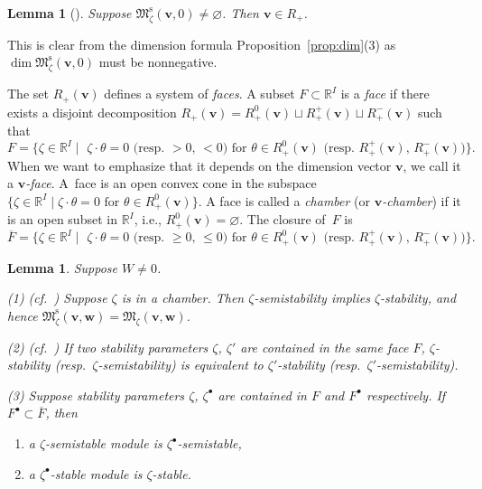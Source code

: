 \documentclass[11pt]{article}
\newenvironment{aenume}{%
  \begin{enumerate}%
  \renewcommand{\theenumi}{\alph{enumi}}%
  \renewcommand{\labelenumi}{\textup{(\theenumi)}}%
  }{\end{enumerate}}
\newtheorem{Lemma}[equation]{Lemma}
\theoremstyle{definition}
\numberwithin{equation}{section}
\newcommand{\propref}[1]{Proposition~\ref{#1}}
\newcommand{\R}{{\mathbb R}}
\newcommand{\M}{{\mathfrak M}} %
\newcommand{\Mreg}{\M^{\operatorname{s}}}
\newcommand{\bv}{{\mathbf v}} %
\newcommand{\bw}{{\mathbf w}} %
\begin{document}
\begin{Lemma}[]\label{lem:nondeg}
  Suppose $\Mreg_\zeta(\bv,0)\neq\varnothing$. Then $\bv \in R_+$.
\end{Lemma}

This is clear from the dimension formula \propref{prop:dim}(3) as
$\dim \Mreg_\zeta(\bv,0)$ must be nonnegative.

The set $R_+(\bv)$ def\/ines a system of {\it faces\/}. A subset
$F\subset \R^I$ is a {\it face\/} if there exists a disjoint
decomposition $R_+(\bv) = R_+^0(\bv) \sqcup R_+^+(\bv) \sqcup
R_+^-(\bv)$ such that
\begin{equation*}
    F = \{ \zeta\in \R^I \mid \text{
     $\zeta\cdot \theta = 0$ (resp.\ $> 0$, $< 0$) for
    $\theta\in R_+^0(\bv)$ (resp.\ $R_+^+(\bv)$, $R_+^-(\bv)$)}\}.
\end{equation*}
%
When we want to emphasize that it depends on the dimension vector
$\bv$, we call it a {\it $\bv$-face}.
%
A~face is an open convex cone in the subspace $\{ \zeta\in\R^I \mid
\text{$\zeta\cdot\theta = 0$ for $\theta\in R_+^0(\bv)$}\}$. A face is
called a {\it chamber\/} (or {\it $\bv$-chamber\/}) if it is an open
subset in $\R^I$, i.e., $R_+^0(\bv) = \varnothing$. The closure of~$F$
is
\begin{equation*}
    \overline{F} = \{ \zeta\in \R^I \mid \text{
     $\zeta\cdot \theta = 0$ (resp.\ $\ge 0$, $\le 0$) for
    $\theta\in R_+^0(\bv)$ (resp.\ $R_+^+(\bv)$, $R_+^-(\bv)$)}\}.
\end{equation*}

\begin{Lemma}\label{lem:face}
  Suppose $W\neq 0$.

  \textup{(1) (cf.\ \cite[2.8]{Na-quiver})} Suppose $\zeta$ is in a
  chamber. Then $\zeta$-semistability implies $\zeta$-stability, and hence
  $\Mreg_\zeta(\bv,\bw) = \M_\zeta(\bv,\bw)$.

  \textup{(2) (cf.\ \cite[1.4]{Na-ADHM})} If two stability parameters
  $\zeta$, $\zeta'$ are contained in the same face $F$,
  $\zeta$-stability \textup(resp.\ $\zeta$-semistability\textup) is
  equivalent to $\zeta'$-stability \textup(resp.\
  $\zeta'$-semistability\textup).

  \textup{(3)} Suppose stability parameters $\zeta$, $\zeta^\bullet$ are
  contained in $F$ and $F^\bullet$ respectively. If $F^\bullet\subset
  \overline{F}$, then
  \begin{aenume}\itemsep=0pt
    \item a $\zeta$-semistable module is $\zeta^\bullet$-semistable,
    \item a $\zeta^\bullet$-stable module is $\zeta$-stable.
  \end{aenume}
\end{Lemma}
\end{document}
